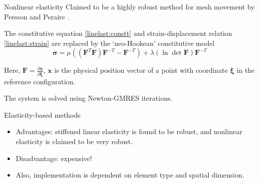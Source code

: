 \documentclass[t,12pt]{beamer}
\let\bld\boldsymbol
\begin{document}
\begin{frame}{Nonlinear elasticity}
Claimed to be a highly robust method for mesh movement by Persson and Peraire . 

The constitutive equation \eqref{linelast:constt} and strain-displacement relation \eqref{linelast:strain} are replaced by the `neo-Hookean' constitutive model
\begin{equation}
\bld{\sigma} = \mu ((\boldsymbol{F}^T\bld{F})\bld{F}^{-T} - \bld{F}^{-T}) + \lambda(\ln \det\bld{F})\bld{F}^{-T}
\end{equation}

Here, $\bld{F} = \frac{\partial\bld{x}}{\partial\bld{\xi}}$, $\bld{x}$ is the physical position vector of a point with coordinate $\bld{\xi}$ in the reference configuration. 

The system is solved using Newton-GMRES iterations.
\end{frame}

\begin{frame}{Elasticity-based methods}
\begin{itemize}
	\item Advantages: stiffened linear elasticity is found to be robust, and nonlinear elasticity is claimed to be very robust.
	\item Disadvantage: expensive!
	\item Also, implementation is dependent on element type and spatial dimension.
\end{itemize}
\end{frame}
\end{document}
